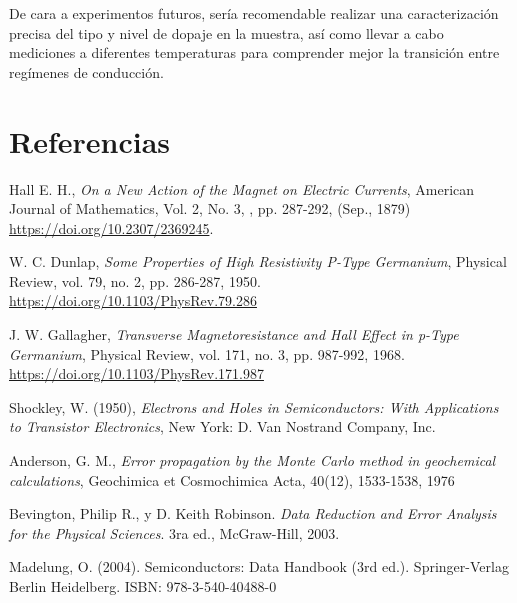 	
	De cara a experimentos futuros, sería recomendable realizar una caracterización precisa del tipo y nivel de dopaje en la muestra, así como llevar a cabo mediciones a diferentes temperaturas para comprender mejor la transición entre regímenes de conducción.

	
	\section{Referencias}
	
	\begin{thebibliography}{99}
	
	Hall E. H.,
	\textit{On a New Action of the Magnet on Electric Currents},
	American Journal of Mathematics, Vol. 2, No. 3, , pp. 287-292, (Sep., 1879)
	\url{https://doi.org/10.2307/2369245}.
	
	
	W. C. Dunlap,
	\textit{Some Properties of High Resistivity P-Type Germanium},
	Physical Review, vol. 79, no. 2, pp. 286-287, 1950.
	\url{https://doi.org/10.1103/PhysRev.79.286}
	
	J. W. Gallagher,
	\textit{Transverse Magnetoresistance and Hall Effect in p-Type Germanium},
	Physical Review, vol. 171, no. 3, pp. 987-992, 1968.
	\url{https://doi.org/10.1103/PhysRev.171.987}
	
	Shockley, W. (1950),
	\textit{Electrons and Holes in Semiconductors: With Applications to Transistor Electronics},
	New York: D. Van Nostrand Company, Inc.
	
	 Anderson, G. M., \textit{Error propagation by the Monte Carlo method in geochemical calculations}, Geochimica et Cosmochimica Acta, 40(12), 1533-1538, 1976
	
	 Bevington, Philip R., y D. Keith Robinson. \textit{Data Reduction and Error Analysis for the Physical Sciences}. 3ra ed., McGraw-Hill, 2003.
	
	Madelung, O. (2004). Semiconductors: Data Handbook (3rd ed.). Springer-Verlag Berlin Heidelberg. ISBN: 978-3-540-40488-0
	
	\end{thebibliography}	

		

	
	
	\newpage	

	
\titleformat{\chapter}[display]
{\normalfont\bfseries}{}{0pt}{\LARGE}
